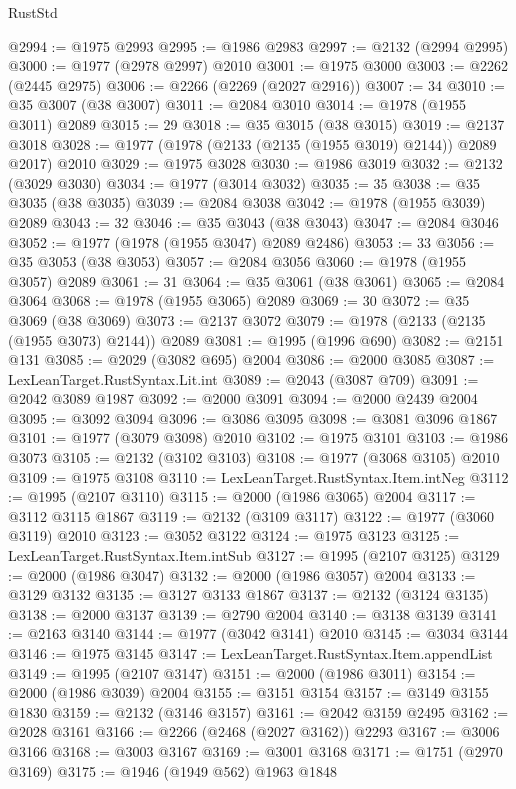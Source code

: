 \begin{lexlean}{RustStd}
\begin{coremodule}
{\begin{coremodule}
{{{{{{{{{{{{{{{{{{{{{{{{{{{{{{{@2994 := @1975 @2993
@2995 := @1986 @2983
@2997 := @2132 (@2994 @2995)
@3000 := @1977 (@2978 @2997) @2010
@3001 := @1975 @3000
@3003 := @2262 (@2445 @2975)
@3006 := @2266 (@2269 (@2027 @2916))
@3007 := 34
@3010 := @35 @3007 (@38 @3007)
@3011 := @2084 @3010
@3014 := @1978 (@1955 @3011) @2089
@3015 := 29
@3018 := @35 @3015 (@38 @3015)
@3019 := @2137 @3018
@3028 := @1977 (@1978 (@2133 (@2135 (@1955 @3019) @2144)) @2089 @2017) @2010
@3029 := @1975 @3028
@3030 := @1986 @3019
@3032 := @2132 (@3029 @3030)
@3034 := @1977 (@3014 @3032)
@3035 := 35
@3038 := @35 @3035 (@38 @3035)
@3039 := @2084 @3038
@3042 := @1978 (@1955 @3039) @2089
@3043 := 32
@3046 := @35 @3043 (@38 @3043)
@3047 := @2084 @3046
@3052 := @1977 (@1978 (@1955 @3047) @2089 @2486)
@3053 := 33
@3056 := @35 @3053 (@38 @3053)
@3057 := @2084 @3056
@3060 := @1978 (@1955 @3057) @2089
@3061 := 31
@3064 := @35 @3061 (@38 @3061)
@3065 := @2084 @3064
@3068 := @1978 (@1955 @3065) @2089
@3069 := 30
@3072 := @35 @3069 (@38 @3069)
@3073 := @2137 @3072
@3079 := @1978 (@2133 (@2135 (@1955 @3073) @2144)) @2089
@3081 := @1995 (@1996 @690)
@3082 := @2151 @131
@3085 := @2029 (@3082 @695) @2004
@3086 := @2000 @3085
@3087 := LexLeanTarget.RustSyntax.Lit.int
@3089 := @2043 (@3087 @709)
@3091 := @2042 @3089 @1987
@3092 := @2000 @3091
@3094 := @2000 @2439 @2004
@3095 := @3092 @3094
@3096 := @3086 @3095
@3098 := @3081 @3096 @1867
@3101 := @1977 (@3079 @3098) @2010
@3102 := @1975 @3101
@3103 := @1986 @3073
@3105 := @2132 (@3102 @3103)
@3108 := @1977 (@3068 @3105) @2010
@3109 := @1975 @3108
@3110 := LexLeanTarget.RustSyntax.Item.intNeg
@3112 := @1995 (@2107 @3110)
@3115 := @2000 (@1986 @3065) @2004
@3117 := @3112 @3115 @1867
@3119 := @2132 (@3109 @3117)
@3122 := @1977 (@3060 @3119) @2010
@3123 := @3052 @3122
@3124 := @1975 @3123
@3125 := LexLeanTarget.RustSyntax.Item.intSub
@3127 := @1995 (@2107 @3125)
@3129 := @2000 (@1986 @3047)
@3132 := @2000 (@1986 @3057) @2004
@3133 := @3129 @3132
@3135 := @3127 @3133 @1867
@3137 := @2132 (@3124 @3135)
@3138 := @2000 @3137
@3139 := @2790 @2004
@3140 := @3138 @3139
@3141 := @2163 @3140
@3144 := @1977 (@3042 @3141) @2010
@3145 := @3034 @3144
@3146 := @1975 @3145
@3147 := LexLeanTarget.RustSyntax.Item.appendList
@3149 := @1995 (@2107 @3147)
@3151 := @2000 (@1986 @3011)
@3154 := @2000 (@1986 @3039) @2004
@3155 := @3151 @3154
@3157 := @3149 @3155 @1830
@3159 := @2132 (@3146 @3157)
@3161 := @2042 @3159 @2495
@3162 := @2028 @3161
@3166 := @2266 (@2468 (@2027 @3162)) @2293
@3167 := @3006 @3166
@3168 := @3003 @3167
@3169 := @3001 @3168
@3171 := @1751 (@2970 @3169)
@3175 := @1946 (@1949 @562) @1963 @1848
}}}}}}}}}}}}}}}}}}}}}}}}}}}}}}}
\end{coremodule}}
\end{coremodule}
\end{lexlean}
